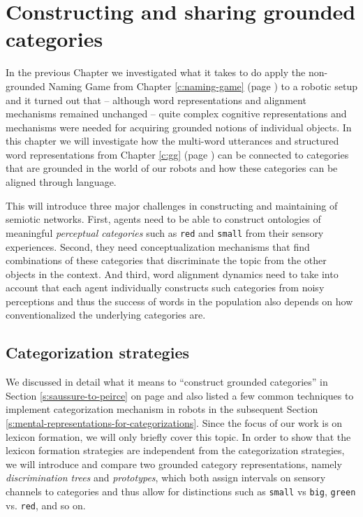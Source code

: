 
\setcounter{chapter}{8}

\chapter{Constructing and sharing grounded categories}
\label{c:grounded-categories}
\label{c:ggg}

In the previous Chapter we investigated what it takes to do apply the
non-grounded Naming Game from Chapter \ref{c:naming-game} (page
\pageref{c:naming-game}) to a robotic setup and it turned out that --
although word representations and alignment mechanisms remained
unchanged -- quite complex cognitive representations and mechanisms
were needed for acquiring grounded notions of individual objects. In
this chapter we will investigate how the multi-word utterances and
structured word representations from Chapter \ref{c:gg} (page
\pageref{c:gg}) can be connected to categories that are grounded in
the world of our robots and how these categories can be aligned
through language.

This will introduce three major challenges in constructing and
maintaining of semiotic networks. First, agents need to be able to
construct ontologies of meaningful \emph{perceptual categories} such
as \texttt{red} and \texttt{small} from their sensory
experiences. Second, they need conceptualization mechanisms that find
combinations of these categories that discriminate the topic from the
other objects in the context. And third, word alignment dynamics need
to take into account that each agent individually constructs such
categories from noisy perceptions and thus the success of words in the
population also depends on how conventionalized the underlying
categories are.


\section{Categorization strategies}

We discussed in detail what it means to ``construct grounded
categories'' in Section \ref{s:saussure-to-peirce} on page
\pageref{s:saussure-to-peirce} and also listed a few common techniques
to implement categorization mechanism in robots in the subsequent
Section \ref{s:mental-representations-for-categorizations}. Since the
focus of our work is on lexicon formation, we will only briefly cover
this topic. In order to show that the lexicon formation strategies are
independent from the categorization strategies, we will introduce and
compare two grounded category representations, namely
\emph{discrimination trees} and \emph{prototypes}, which both assign
intervals on sensory channels to categories and thus allow for
distinctions such as \texttt{small} vs \texttt{big}, \texttt{green}
vs. \texttt{red}, and so on.

